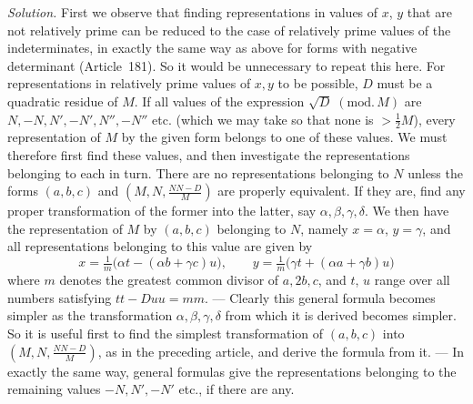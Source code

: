 \textit{Solution.} First we observe that finding representations in values of $x$, $y$ that are not relatively prime can be reduced to the case of relatively prime values of the indeterminates, in exactly the same way as above for forms with negative determinant (Article~181). So it would be unnecessary to repeat this here. For representations in relatively prime values of $x,y$ to be possible, $D$ must be a quadratic residue of $M$. If all values of the expression $\sqrt D\;(\mathrm{mod.}\,M)$ are $N,-N,N',-N',N'',-N''$ etc. (which we may take so that none is $>\tfrac12M$), every representation of $M$ by the given form belongs to one of these values. We must therefore first find these values, and then investigate the representations belonging to each in turn. There are no representations belonging to $N$ unless the forms $(a,b,c)$ and $(M,N,\frac{NN-D}{M})$ are properly equivalent. If they are, find any proper transformation of the former into the latter, say $\alpha,\beta,\gamma,\delta$. We then have the representation of $M$ by $(a,b,c)$ belonging to $N$, namely $x=\alpha$, $y=\gamma$, and all representations belonging to this value are given by
\[
x=\tfrac1m\bigl(\alpha t-(\alpha b+\gamma c)u\bigr),\qquad
y=\tfrac1m\bigl(\gamma t+(\alpha a+\gamma b)u\bigr)
\]
where $m$ denotes the greatest common divisor of $a,2b,c$, and $t$, $u$ range over all numbers satisfying $tt-Duu=mm$. --- Clearly this general formula becomes simpler as the transformation $\alpha,\beta,\gamma,\delta$ from which it is derived becomes simpler. So it is useful first to find the simplest transformation of $(a,b,c)$ into $(M,N,\frac{NN-D}{M})$, as in the preceding article, and derive the formula from it. --- In exactly the same way, general formulas give the representations belonging to the remaining values $-N,N',-N'$ etc., if there are any.

